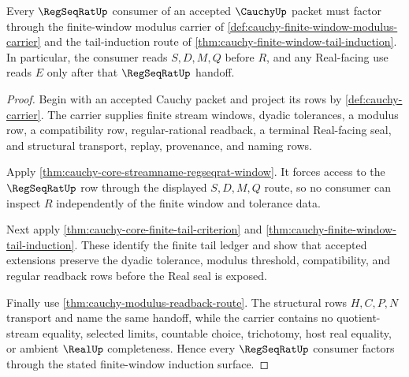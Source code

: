 \begin{theorem}
\label{thm:cauchy-regseqrat-handoff-obligation}
Every $\RegSeqRatUp$ consumer of an accepted $\CauchyUp$ packet must factor through the finite-window modulus carrier of \autoref{def:cauchy-finite-window-modulus-carrier} and the tail-induction route of \autoref{thm:cauchy-finite-window-tail-induction}. In particular, the consumer reads $S,D,M,Q$ before $R$, and any Real-facing use reads $E$ only after that $\RegSeqRatUp$ handoff.
\end{theorem}
\begin{proof}
Begin with an accepted Cauchy packet and project its rows by \autoref{def:cauchy-carrier}. The carrier supplies finite stream windows, dyadic tolerances, a modulus row, a compatibility row, regular-rational readback, a terminal Real-facing seal, and structural transport, replay, provenance, and naming rows.

Apply \autoref{thm:cauchy-core-streamname-regseqrat-window}. It forces access to the $\RegSeqRatUp$ row through the displayed $S,D,M,Q$ route, so no consumer can inspect $R$ independently of the finite window and tolerance data.

Next apply \autoref{thm:cauchy-core-finite-tail-criterion} and \autoref{thm:cauchy-finite-window-tail-induction}. These identify the finite tail ledger and show that accepted extensions preserve the dyadic tolerance, modulus threshold, compatibility, and regular readback rows before the Real seal is exposed.

Finally use \autoref{thm:cauchy-modulus-readback-route}. The structural rows $H,C,P,N$ transport and name the same handoff, while the carrier contains no quotient-stream equality, selected limits, countable choice, trichotomy, host real equality, or ambient $\RealUp$ completeness. Hence every $\RegSeqRatUp$ consumer factors through the stated finite-window induction surface.
\end{proof}

